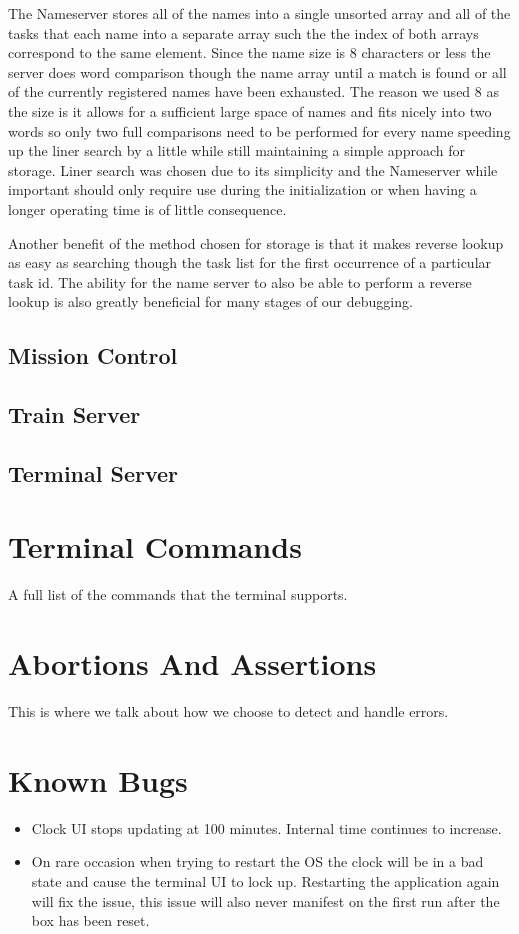 \documentclass[pdftex,10pt,a4paper]{article}
\begin{document}
The Nameserver stores all of the names into a single unsorted array
and all of the tasks that each name into a separate array such the the
index of both arrays correspond to the same element. Since the name
size is 8 characters or less the server does word comparison though
the name array until a match is found or all of the currently
registered names have been exhausted. The reason we used 8 as the size
is it allows for a sufficient large space of names and fits nicely
into two words so only two full comparisons need to be performed for
every name speeding up the liner search by a little while still
maintaining a simple approach for storage. Liner search was chosen due
to its simplicity and the Nameserver while important should only
require use during the initialization or when having a longer
operating time is of little consequence.

Another benefit of the method chosen for storage is that it makes reverse
lookup as easy as searching though the task list for the first occurrence
of a particular task id. The ability for the name server to also be able to
perform a reverse lookup is also greatly beneficial for many stages of our
debugging.

\subsection*{Mission Control}

\subsection*{Train Server}

\subsection*{Terminal Server}


\section*{Terminal Commands}

A full list of the commands that the terminal supports.

\section*{Abortions And Assertions}

This is where we talk about how we choose to detect and handle errors.


\section*{Known Bugs}

\begin{itemize}
\item Clock UI stops updating at 100 minutes. Internal time continues to
	increase.
\item On rare occasion when trying to restart the OS the clock will be in a
	bad state and cause the terminal UI to lock up. Restarting the
	application again will fix the issue, this issue will also never
	manifest on the first run after the box has been reset.
\end{itemize}
\end{document}
